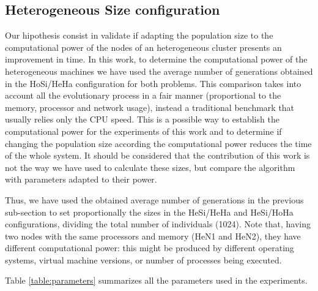 \documentclass[final,1p,times]{elsarticle}
\begin{document}
\subsection{Heterogeneous Size configuration}

Our hipothesis consist in validate if adapting the population size to the computational power of the nodes of an heterogeneous cluster presents an improvement in time. In this work, to determine the computational power of the heterogeneous machines we have used the average number of generations obtained in the HoSi/HeHa configuration for both problems. This comparison takes into account all the evolutionary process in a fair manner (proportional to the memory, processor and network usage), instead a traditional benchmark that usually relies only the CPU speed. This is a possible way to establish the computational power for the experiments of this work and to determine if changing the population size according the computational power reduces the time of the whole system. It should be considered that the contribution of this work is not the way we have used to calculate these sizes, but compare the algorithm with parameters adapted to their power.

Thus, we have used the obtained average number of generations in the previous sub-section to set proportionally the sizes in the HeSi/HeHa and HeSi/HoHa configurations, dividing the total number of individuals (1024). Note that, having two nodes with the same processors and memory (HeN1 and HeN2), they have different computational power: this might be produced by different operating systems, virtual machine versions, or number of processes being executed.

Table \ref{table:parameters} summarizes all the parameters used in the experiments.
\end{document}
